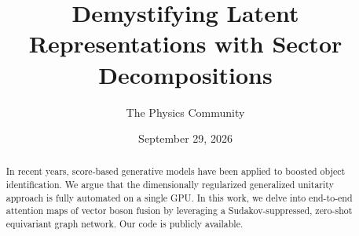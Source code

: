 \documentclass[11pt]{article}
\title{Demystifying Latent Representations with Sector Decompositions}
\author{The Physics Community}
\date{September 29, 2026}
\numberwithin{equation}{section}
\theoremstyle{definition}
\theoremstyle{remark}
\begin{document}
\maketitle
\begin{abstract}
In recent years, score-based generative models have been applied to
boosted object identification. We argue that the dimensionally
regularized generalized unitarity approach is fully automated on a
single GPU. In this work, we delve into end-to-end attention maps of
vector boson fusion by leveraging a Sudakov-suppressed, zero-shot
equivariant graph network. Our code is publicly available.
\end{abstract}
\tableofcontents



\nocite{*}


\end{document}
